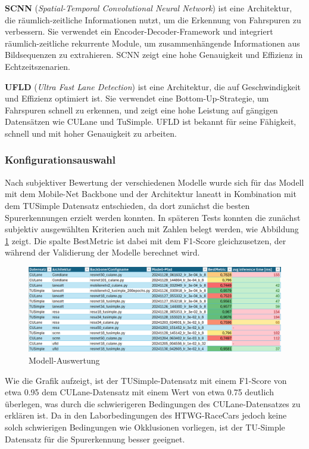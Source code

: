 \documentclass{article}
\begin{document}
                \textbf{SCNN} (\textit{Spatial-Temporal Convolutional Neural Network}) ist eine Architektur, die räumlich-zeitliche Informationen nutzt, um die Erkennung von Fahrspuren zu verbessern. Sie verwendet ein Encoder-Decoder-Framework und integriert räumlich-zeitliche rekurrente Module, um zusammenhängende Informationen aus Bildsequenzen zu extrahieren. SCNN zeigt eine hohe Genauigkeit und Effizienz in Echtzeitszenarien.
                \cite{Li2024Enhanced}

                \textbf{UFLD} (\textit{Ultra Fast Lane Detection}) ist eine Architektur, die auf Geschwindigkeit und Effizienz optimiert ist. Sie verwendet eine Bottom-Up-Strategie, um Fahrspuren schnell zu erkennen, und zeigt eine hohe Leistung auf gängigen Datensätzen wie CULane und TuSimple. UFLD ist bekannt für seine Fähigkeit, schnell und mit hoher Genauigkeit zu arbeiten.
                \cite{Xu2024Exploring}

            \subsubsection{Konfigurationsauswahl}
                Nach subjektiver Bewertung der verschiedenen Modelle wurde sich für das Modell mit dem Mobile-Net Backbone und der Architektur laneatt in Kombination mit dem TUSimple Datensatz entschieden, da dort zunächst die besten Spurerkennungen erzielt werden konnten.
                In späteren Tests konnten die zunächst subjektiv ausgewählten Kriterien auch mit Zahlen belegt werden, wie Abbildung \ref{fig:Modell_Auswertung} zeigt.
                Die spalte BestMetric ist dabei mit dem F1-Score gleichzusetzen, der während der Validierung der Modelle berechnet wird.
                \begin{figure}[h!]
                    \includegraphics[width=\linewidth]{Auswertung_BackBone_Datensatz.png}
                    \caption{Modell-Auswertung}
                    \label{fig:Modell_Auswertung}
                \end{figure}
                Wie die Grafik aufzeigt, ist der TUSimple-Datensatz mit einem F1-Score von etwa 0.95 dem CULane-Datensatz mit einem Wert von etwa 0.75 deutlich überlegen, was durch die schwierigeren Bedingungen des CULane-Datensatzes zu erklären ist. Da in den Laborbedingungen des HTWG-RaceCars jedoch keine solch schwierigen Bedingungen wie Okklusionen vorliegen, ist der TU-Simple Datensatz für die Spurerkennung besser geeignet.
\end{document}

